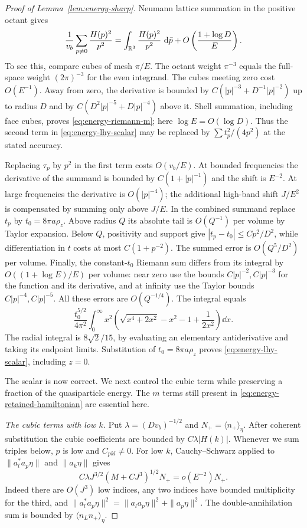 \begin{proof}[Proof of Lemma~\ref{lem:energy-sharp}]
Neumann lattice summation in the positive octant gives
\begin{equation}\label{eq:energy-riemann-m}
 \frac1{v_b}\sum_{p\ne0}\frac{H(p)^2}{p^2}
   =\int_{\mathbb R^3}\frac{H(p)^2}{p^2}\,\,\mathrm d\bar p
                    +O\left(\frac{1+\log D}{E}\right).
\end{equation}
To see this, compare cubes of mesh $\pi/E$.  The octant weight
$\pi^{-3}$ equals the full-space weight $(2\pi)^{-3}$ for the even
integrand.  The cubes meeting zero cost $O(E^{-1})$.  Away from zero,
the derivative is bounded by
$C(|p|^{-3}+D^{-1}|p|^{-2})$ up to radius $D$ and by
$C(D^2|p|^{-5}+D|p|^{-4})$ above it.  Shell summation, including face
cubes, proves \eqref{eq:energy-riemann-m}; here $\log E=O(\log D)$.
Thus the second term in \eqref{eq:energy-lhy-scalar} may be replaced
by $\sum t_p^2/(4p^2)$ at the stated accuracy.

Replacing $\tau_p$ by $p^2$ in the first term costs $O(v_b/E)$.
At bounded frequencies the derivative of the summand is bounded by
$C(1+|p|^{-1})$ and the shift is $E^{-2}$.  At large frequencies the
derivative is $O(|p|^{-4})$; the additional high-band shift $J/E^2$
is compensated by summing only above $J/E$.
In the combined summand replace $t_p$ by $t_0=8\pi a\rho_z$.
Above radius $Q$ its absolute tail is $O(Q^{-1})$ per volume by Taylor
expansion.  Below $Q$, positivity and support give
$|t_p-t_0|\le Cp^2/D^2$, while differentiation in $t$ costs at most
$C(1+p^{-2})$.  The summed error is $O(Q^5/D^2)$ per volume.
Finally, the constant-$t_0$ Riemann sum differs from its integral by
$O((1+\log E)/E)$ per volume: near zero use the bounds
$C|p|^{-2},C|p|^{-3}$ for the function and its derivative, and at infinity
use the Taylor bounds $C|p|^{-4},C|p|^{-5}$.
All these errors are $O(Q^{-1/4})$.
The integral equals
\[
 \frac{t_0^{5/2}}{4\pi^2}
 \int_0^\infty x^2
   \left(\sqrt{x^4+2x^2}-x^2-1+\frac1{2x^2}\right)\dd x.
\]
The radial integral is $8\sqrt2/15$, by evaluating an elementary
antiderivative and taking its endpoint limits.  Substitution of
$t_0=8\pi a\rho_z$ proves \eqref{eq:energy-lhy-scalar}, including $z=0$.

The scalar is now correct.  We next control the cubic term while
preserving a fraction of the quasiparticle energy.  The $m$ terms still
present in \eqref{eq:energy-retained-hamiltonian} are essential here.

\emph{The cubic terms with low $k$.}
Put $\lambda=(Dv_b)^{-1/2}$ and $N_+=\langle n_+\rangle_\eta$.
After coherent substitution the cubic coefficients are bounded by
$C\lambda|H(k)|$.  Whenever we sum triples below, $p$ is low and
$C_{pkl}\ne0$.
For low $k$, Cauchy--Schwarz applied to
$\|a_l^*a_p\eta\|$ and $\|a_k\eta\|$ gives
\begin{equation}\label{eq:energy-low-cubic}
 C\lambda J^{3/2}(M+CJ^3)^{1/2}N_+=o(E^{-2})N_+.
\end{equation}
Indeed there are $O(J^3)$ low indices, any two indices have bounded
multiplicity for the third, and
$\|a_l^*a_p\eta\|^2=\|a_la_p\eta\|^2+\|a_p\eta\|^2$.
The double-annihilation sum is bounded by
$\langle n_Ln_+\rangle_\eta$.


\end{proof}

